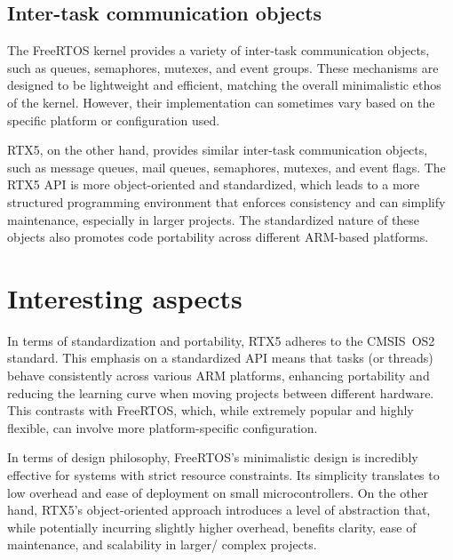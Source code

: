 \subsection*{Inter-task communication objects}

The FreeRTOS kernel provides a variety of inter-task communication objects, such as queues, semaphores, mutexes, and event groups.
These mechanisms are designed to be lightweight and efficient, matching the overall minimalistic ethos of the kernel.
However, their implementation can sometimes vary based on the specific platform or configuration used.

RTX5, on the other hand, provides similar inter-task communication objects, such as message queues, mail queues, semaphores, mutexes, and event flags.
The RTX5 API is more object-oriented and standardized, which leads to a more structured programming environment that enforces consistency and can simplify maintenance, especially in larger projects.
The standardized nature of these objects also promotes code portability across different ARM-based platforms.

\section*{Interesting aspects}

In terms of standardization and portability, RTX5 adheres to the CMSIS OS2 standard.
This emphasis on a standardized API means that tasks (or threads) behave consistently across various ARM platforms, enhancing portability and reducing the learning curve when moving projects between different hardware.
This contrasts with FreeRTOS, which, while extremely popular and highly flexible, can involve more platform-specific configuration.

In terms of design philosophy, FreeRTOS’s minimalistic design is incredibly effective for systems with strict resource constraints.
Its simplicity translates to low overhead and ease of deployment on small microcontrollers.
On the other hand, RTX5’s object-oriented approach introduces a level of abstraction that, while potentially incurring slightly higher overhead, benefits clarity, ease of maintenance, and scalability in larger/ complex projects.
